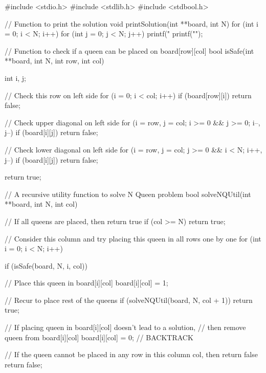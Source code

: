 #include <stdio.h> 
#include <stdlib.h> 
#include <stdbool.h> 
 
// Function to print the solution 
void printSolution(int **board, int N) 
{ 
    for (int i = 0; i < N; i++) 
    { 
        for (int j = 0; j < N; j++) 
        { 
            printf("%
        } 
        printf("\n"); 
    } 
} 
 
// Function to check if a queen can be placed on board[row][col] 
bool isSafe(int **board, int N, int row, int col) 
{ 
    int i, j; 
 
    // Check this row on left side 
    for (i = 0; i < col; i++) 
    { 
        if (board[row][i]) 
        { 
            return false; 
        } 
    } 
 
    // Check upper diagonal on left side 
    for (i = row, j = col; i >= 0 && j >= 0; i--, j--) 
    { 
        if (board[i][j]) 
        { 
            return false; 
        } 
    } 
 
    // Check lower diagonal on left side 
    for (i = row, j = col; j >= 0 && i < N; i++, j--) 
    { 
        if (board[i][j]) 
        { 
            return false; 
        } 
    } 
 
    return true; 
} 
 
// A recursive utility function to solve N Queen problem 
bool solveNQUtil(int **board, int N, int col) 
{ 
    // If all queens are placed, then return true 
    if (col >= N) 
    { 
        return true; 
    } 
 
    // Consider this column and try placing this queen in all rows one by one 
    for (int i = 0; i < N; i++) 
    { 
        if (isSafe(board, N, i, col)) 
        { 
            // Place this queen in board[i][col] 
            board[i][col] = 1; 
 
            // Recur to place rest of the queens 
            if (solveNQUtil(board, N, col + 1)) 
            { 
                return true; 
            } 
 
            // If placing queen in board[i][col] doesn't lead to a solution, 
            // then remove queen from board[i][col] 
            board[i][col] = 0; // BACKTRACK 
        } 
    } 
 
    // If the queen cannot be placed in any row in this column col, then return false 
    return false; 
} 
 
